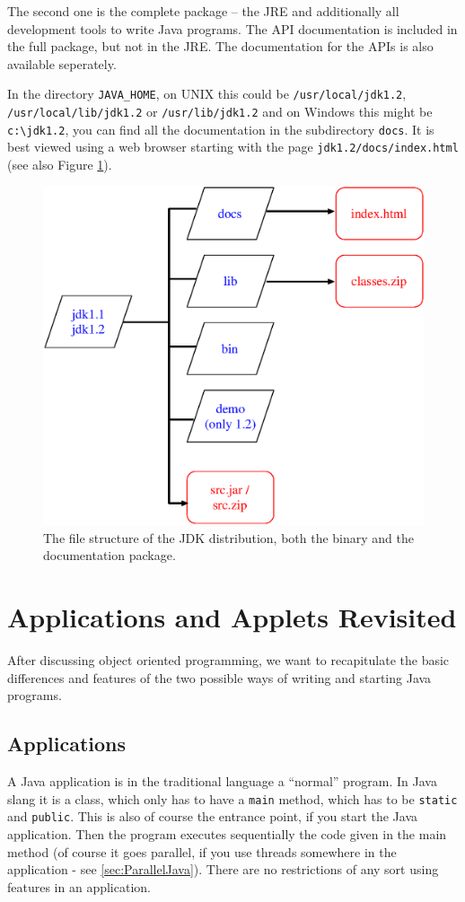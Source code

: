 The second one is the complete package -- 
the JRE and additionally all development tools to write Java programs.
The API documentation is included in the full package, but not
in the JRE. The documentation for the APIs is also available seperately.

In the directory \verb|JAVA_HOME|, on UNIX this could be 
\verb|/usr/local/jdk1.2|, \verb|/usr/local/lib/jdk1.2| or 
\verb|/usr/lib/jdk1.2| and on Windows this might be \verb|c:\jdk1.2|, 
you can find all the documentation in the subdirectory
\verb|docs|. It is best viewed using a web browser
starting with the page \verb|jdk1.2/docs/index.html| 
(see also Figure \ref{fig:JDKFiles}).
\begin{figure}[htbp]
  \begin{center}
    \includegraphics[width=.6\textwidth]{Figures/JDKDocumentation.eps}
    \caption{The file structure of the JDK distribution, 
      both the binary and the documentation package.}
    \label{fig:JDKFiles}
  \end{center}
\end{figure}


\section{Applications and Applets Revisited}

After discussing object oriented programming,
we want to recapitulate the basic differences and features of
the two possible ways of writing and starting Java programs.

\subsection{Applications}
A Java application is in the traditional language a ``normal'' program.
In Java slang it is a class, which only has to have a \verb|main|
method, which has to be \verb|static| and \verb|public|. This is also of course the
entrance point, if you start the Java application. Then the program
executes sequentially the code given in the main method (of course it
goes parallel, if you use threads somewhere in the application - see
\ref{sec:ParallelJava}). There are no restrictions of any sort using
features in an application.


